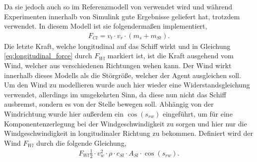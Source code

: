 \documentclass[]{iat}
\begin{document}
Da sie jedoch auch so im Referenzmodell von \cite[Knud Benedict \& Matthias Kirchhoff]{Benedict2007ExplainingSD} verwendet wird und während Experimenten innerhalb von Simulink gute Ergebnisse geliefert hat, trotzdem verwendet. In diesem Modell ist sie folgendermaßen implementiert,
\begin{align}
    F_{Cl} = v_t \cdot v_r \cdot (m_{s}+ m_{St}).
\end{align}
Die letzte Kraft, welche longitudinal auf das Schiff wirkt und in Gleichung \ref{eq:longitudinal_force} durch $F_{Wl}$ markiert ist, ist die Kraft ausgehend vom Wind, welcher aus verschiedenen Richtungen wehen kann. Der Wind wirkt innerhalb dieses Modells als die Störgröße, welcher der Agent ausgleichen soll. Um den Wind zu modellieren wurde auch hier wieder eine Widerstandsgleichung verwendet, allerdings im umgekehrten Sinn, da diese nun nicht das Schiff ausbremst, sondern es von der Stelle bewegen soll. Abhängig von der Windrichtung wurde hier außerdem ein $\cos(s_{rw})$ eingeführt, um für eine Komponentenzerlegung bei der Windgeschwindigkeit zu sorgen und hier nur die Windgeschwindigkeit in longitudinaler Richtung zu bekommen. Definiert wird der Wind $F_{Wl}$ durch die folgende Gleichung,
\begin{align}
    F_{Wl} \frac{1}{2} \cdot v_w^2 \cdot \rho \cdot c_{Sl} \cdot A_{Sl} \cdot \cos(s_{rw}). \label{eq:wind_wl}
\end{align}
\end{document}
